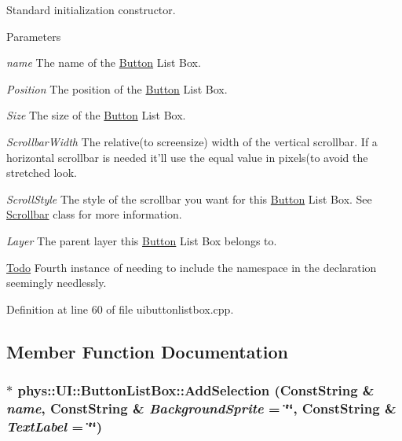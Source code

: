 Standard initialization constructor. 


\begin{DoxyParams}{Parameters}
\item[{\em name}]The name of the \hyperlink{classphys_1_1UI_1_1Button}{Button} List Box. \item[{\em Position}]The position of the \hyperlink{classphys_1_1UI_1_1Button}{Button} List Box. \item[{\em Size}]The size of the \hyperlink{classphys_1_1UI_1_1Button}{Button} List Box. \item[{\em ScrollbarWidth}]The relative(to screensize) width of the vertical scrollbar. If a horizontal scrollbar is needed it'll use the equal value in pixels(to avoid the stretched look. \item[{\em ScrollStyle}]The style of the scrollbar you want for this \hyperlink{classphys_1_1UI_1_1Button}{Button} List Box. See \hyperlink{classphys_1_1UI_1_1Scrollbar}{Scrollbar} class for more information. \item[{\em Layer}]The parent layer this \hyperlink{classphys_1_1UI_1_1Button}{Button} List Box belongs to. \end{DoxyParams}


\begin{Desc}
\item[\hyperlink{todo__todo000022}{Todo}]Fourth instance of needing to include the namespace in the declaration seemingly needlessly. \end{Desc}




Definition at line 60 of file uibuttonlistbox.cpp.



\subsection{Member Function Documentation}
\hypertarget{classphys_1_1UI_1_1ButtonListBox_afc976097cd2b1a039882e07272f9a464}{
\subsubsection[{AddSelection}]{ $\ast$ phys::UI::ButtonListBox::AddSelection ({\bf ConstString} \& {\em name}, \/  {\bf ConstString} \& {\em BackgroundSprite} = {\ttfamily \char`\"{}\char`\"{}}, \/  {\bf ConstString} \& {\em TextLabel} = {\ttfamily \char`\"{}\char`\"{}})}}
\label{d4/dd7/classphys_1_1UI_1_1ButtonListBox_afc976097cd2b1a039882e07272f9a464}


